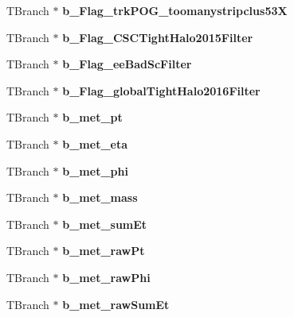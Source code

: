 \begin{DoxyCompactItemize}
T\+Branch $\ast$ {\bfseries b\+\_\+\+Flag\+\_\+trk\+P\+O\+G\+\_\+toomanystripclus53X}
\item 
\hypertarget{classMiniTree_a8ecfc46d828e27f87103cf5682b919d3}{}\label{classMiniTree_a8ecfc46d828e27f87103cf5682b919d3} 
T\+Branch $\ast$ {\bfseries b\+\_\+\+Flag\+\_\+\+C\+S\+C\+Tight\+Halo2015\+Filter}
\item 
\hypertarget{classMiniTree_a27cec0fb829b92134cf6d067e2a1e6af}{}\label{classMiniTree_a27cec0fb829b92134cf6d067e2a1e6af} 
T\+Branch $\ast$ {\bfseries b\+\_\+\+Flag\+\_\+ee\+Bad\+Sc\+Filter}
\item 
\hypertarget{classMiniTree_a3d7cb457da00afd4ab4a34e8870baca0}{}\label{classMiniTree_a3d7cb457da00afd4ab4a34e8870baca0} 
T\+Branch $\ast$ {\bfseries b\+\_\+\+Flag\+\_\+global\+Tight\+Halo2016\+Filter}
\item 
\hypertarget{classMiniTree_ab1ff8c1b6229d7ab3dcd86d64dcc7dd8}{}\label{classMiniTree_ab1ff8c1b6229d7ab3dcd86d64dcc7dd8} 
T\+Branch $\ast$ {\bfseries b\+\_\+met\+\_\+pt}
\item 
\hypertarget{classMiniTree_ad492bbecd41957490c8eaa5824264227}{}\label{classMiniTree_ad492bbecd41957490c8eaa5824264227} 
T\+Branch $\ast$ {\bfseries b\+\_\+met\+\_\+eta}
\item 
\hypertarget{classMiniTree_ad8d4f75af3e737c1746df5f29ac81e9f}{}\label{classMiniTree_ad8d4f75af3e737c1746df5f29ac81e9f} 
T\+Branch $\ast$ {\bfseries b\+\_\+met\+\_\+phi}
\item 
\hypertarget{classMiniTree_a5360e5c63d513ac25838292c0cb7e02f}{}\label{classMiniTree_a5360e5c63d513ac25838292c0cb7e02f} 
T\+Branch $\ast$ {\bfseries b\+\_\+met\+\_\+mass}
\item 
\hypertarget{classMiniTree_aa997b94a42bc8d8f1552b49b18f50a35}{}\label{classMiniTree_aa997b94a42bc8d8f1552b49b18f50a35} 
T\+Branch $\ast$ {\bfseries b\+\_\+met\+\_\+sum\+Et}
\item 
\hypertarget{classMiniTree_a98ff90912e6aa7268c36f331b7f84ca7}{}\label{classMiniTree_a98ff90912e6aa7268c36f331b7f84ca7} 
T\+Branch $\ast$ {\bfseries b\+\_\+met\+\_\+raw\+Pt}
\item 
\hypertarget{classMiniTree_a49c17c6d951f4774b923d1075117d6ce}{}\label{classMiniTree_a49c17c6d951f4774b923d1075117d6ce} 
T\+Branch $\ast$ {\bfseries b\+\_\+met\+\_\+raw\+Phi}
\item 
\hypertarget{classMiniTree_a8016690b8a900117b767956728ff3815}{}\label{classMiniTree_a8016690b8a900117b767956728ff3815} 
T\+Branch $\ast$ {\bfseries b\+\_\+met\+\_\+raw\+Sum\+Et}
\item 

\end{DoxyCompactItemize}
